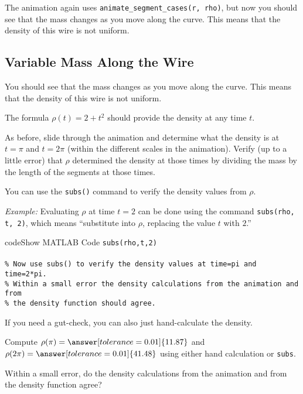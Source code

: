 \documentclass{ximera}
\begin{document}

The animation again uses \texttt{animate\_segment\_cases(r, rho)}, but now you should see that the mass changes as you move along the curve. This means that the density of this wire is not uniform.

\subsection*{Variable Mass Along the Wire}

You should see that the mass changes as you move along the curve. This means that the density of this wire is not uniform.

The formula $\rho(t) = 2 + t^2$ should provide the density at any time $t$. 

As before, slide through the animation and determine what the density is at $t=\pi$ and $t=2\pi$ (within the different scales in the animation). Verify (up to a little error) that $\rho$ determined the density at those times by dividing the mass by the length of the segments at those times.

You can use the \texttt{subs()} command to verify the density values from $\rho$. 

\begin{remark}
\textit{Example:} Evaluating $\rho$ at time $t=2$ can be done using the command \texttt{subs(rho, t, 2)}, which means ``substitute into $\rho$, replacing the value $t$ with $2$.''
\end{remark}

\begin{expandable}{code}{Show MATLAB Code}
\texttt{subs(rho,t,2)}\\
\\
\texttt{\% Now use subs() to verify the density values at time=pi and time=2*pi.}\\
\texttt{\% Within a small error the density calculations from the animation and from}\\
\texttt{\% the density function should agree.}
\end{expandable}

\begin{problem}
If you need a gut-check, you can also just hand-calculate the density.

Compute $\rho(\pi) = \answer[tolerance=0.01]{11.87}$ and $\rho(2\pi) = \answer[tolerance=0.01]{41.48}$ using either hand calculation or \texttt{subs}. 

Within a small error, do the density calculations from the animation and from the density function agree? 
\end{problem}
\end{document}
